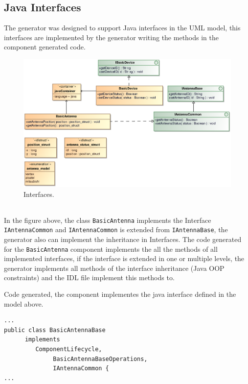 \subsection{Java Interfaces}
The generator was designed to support Java interfaces in the UML model, this
interfaces are implemented by the generator writing the methods in the
component generated code.\\ 
\begin{figure}[h!t]
\begin{center}
\includegraphics[scale=0.8]{images/example3}
\caption{\label{fig:vs_diag}Interfaces.}
\end{center}
\end{figure}
\\
In the figure above, the class  \verb+BasicAntenna+ implements the Interface
\verb+IAntennaCommon+ and \verb+IAntennaCommon+ is extended from
\verb+IAntennaBase+, the generator also can implement the inheritance in
Interfaces. The code generated for the \verb+BasicAntenna+ component implements
the all the methods of all  implemented interfaces, if the interface is extended
in one or multiple levels, the generator implements all methods of the interface
inheritance (Java OOP constraints) and the IDL file implement this methods to.

Code generated, the component implementes the java interface defined in the
model above.
\begin{center}
\begin{verbatim}
...
public class BasicAntennaBase
      implements
         ComponentLifecycle,
              BasicAntennaBaseOperations,
              IAntennaCommon {
...
\end{verbatim}
\end{center}

